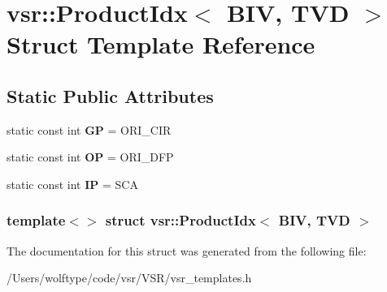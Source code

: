 \hypertarget{structvsr_1_1_product_idx_3_01_b_i_v_00_01_t_v_d_01_4}{\section{vsr\-:\-:Product\-Idx$<$ B\-I\-V, T\-V\-D $>$ Struct Template Reference}
\label{structvsr_1_1_product_idx_3_01_b_i_v_00_01_t_v_d_01_4}
}
\subsection*{Static Public Attributes}
\begin{DoxyCompactItemize}
\item 
\hypertarget{structvsr_1_1_product_idx_3_01_b_i_v_00_01_t_v_d_01_4_a48221127caa8205b57208d21452d27c1}{static const int {\bfseries G\-P} = O\-R\-I\-\_\-\-C\-I\-R}\label{structvsr_1_1_product_idx_3_01_b_i_v_00_01_t_v_d_01_4_a48221127caa8205b57208d21452d27c1}

\item 
\hypertarget{structvsr_1_1_product_idx_3_01_b_i_v_00_01_t_v_d_01_4_aeadab9c2f6aff4837473e68d6f8dfc43}{static const int {\bfseries O\-P} = O\-R\-I\-\_\-\-D\-F\-P}\label{structvsr_1_1_product_idx_3_01_b_i_v_00_01_t_v_d_01_4_aeadab9c2f6aff4837473e68d6f8dfc43}

\item 
\hypertarget{structvsr_1_1_product_idx_3_01_b_i_v_00_01_t_v_d_01_4_ad38982ba4870a022f6684512114554ad}{static const int {\bfseries I\-P} = S\-C\-A}\label{structvsr_1_1_product_idx_3_01_b_i_v_00_01_t_v_d_01_4_ad38982ba4870a022f6684512114554ad}

\end{DoxyCompactItemize}
\subsubsection*{template$<$$>$ struct vsr\-::\-Product\-Idx$<$ B\-I\-V, T\-V\-D $>$}



The documentation for this struct was generated from the following file\-:\begin{DoxyCompactItemize}
\item 
/\-Users/wolftype/code/vsr/\-V\-S\-R/vsr\-\_\-templates.\-h\end{DoxyCompactItemize}
